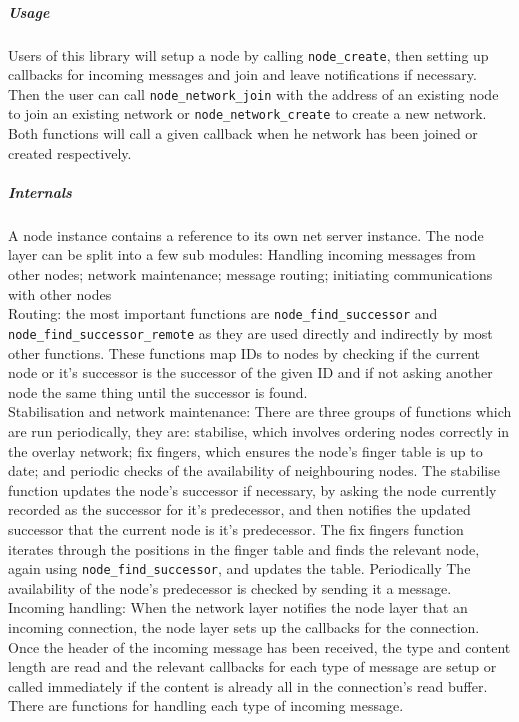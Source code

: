 \documentclass{article}
\begin{document}

\subparagraph{Usage}
Users of this library will setup a node by calling \texttt{node\_create}, then setting up callbacks for incoming messages and join and leave notifications if necessary.
\\
Then the user can call \texttt{node\_network\_join} with the address of an existing node to join an existing network or \texttt{node\_network\_create} to create a new network. Both functions will call a given callback when he network has been joined or created respectively.

\subparagraph{Internals}
A node instance contains a reference to its own net server instance.
The node layer can be split into a few sub modules: Handling incoming messages from other nodes; network maintenance; message routing; initiating communications with other nodes
\\
Routing: the most important functions are \texttt{node\_find\_successor} and \\\texttt{node\_find\_successor\_remote} as they are used directly and indirectly by most other functions. These functions map IDs to nodes by checking if the current node or it's successor is the successor of the given ID and if not asking another node the same thing until the successor is found.
\\
Stabilisation and network maintenance: There are three groups of functions which are run periodically, they are: stabilise, which involves ordering nodes correctly in the overlay network; fix fingers, which ensures the node's finger table is up to date; and periodic checks of the availability of neighbouring nodes.
The stabilise function updates the node's successor if necessary, by asking the node currently recorded as the successor for it's predecessor, and then notifies the updated successor that the current node is it's predecessor.
The fix fingers function iterates through the positions in the finger table and finds the relevant node, again using \texttt{node\_find\_successor}, and updates the table.
Periodically The availability of the node's predecessor is checked by sending it a message.
\\
Incoming handling: When the network layer notifies the node layer that an incoming connection, the node layer sets up the callbacks for the connection. Once the header of the incoming message has been received, the type and content length are read and the relevant callbacks for each type of message are setup or called immediately if the content is already all in the connection's read buffer. There are functions for handling each type of incoming message.
\end{document}
